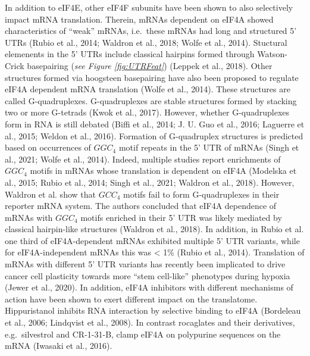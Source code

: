 \documentclass[12pt,openany]{book}
\begin{document}
In addition to eIF4E, other eIF4F subunits have been shown to also
selectively impact mRNA translation. Therein, mRNAs dependent on eIF4A
showed characteristics of ``weak'' mRNAs, i.e.~these mRNAs had long and
structured 5' UTRs (Rubio et al., 2014; Waldron et al., 2018; Wolfe et
al., 2014). Stuctural elemenents in the 5' UTRs include classical
hairpins formed through Watson-Crick basepairing (\emph{see Figure
\ref{fig:UTRFeat}}) (Leppek et al., 2018). Other structures formed via
hoogsteen basepairing have also been proposed to regulate eIF4A
dependent mRNA translation (Wolfe et al., 2014). These structures are
called G-quadruplexes. G-quadruplexes are stable structures formed by
stacking two or more G-tetrads (Kwok et al., 2017). However, whether
G-quadruplexes form in RNA is still debated (Biffi et al., 2014; J. U.
Guo et al., 2016; Laguerre et al., 2015; Weldon et al., 2016). Formation
of G-quadruplex structures is predicted based on occurrences of
\(GGC_4\) motif repeats in the 5' UTR of mRNAs (Singh et al., 2021;
Wolfe et al., 2014). Indeed, multiple studies report enrichments of
\(GGC_4\) motifs in mRNAs whose translation is dependent on eIF4A
(Modelska et al., 2015; Rubio et al., 2014; Singh et al., 2021; Waldron
et al., 2018). However, Waldron et al. show that \(GCC_4\) motifs fail
to form G-quadruplexes in their reporter mRNA system. The authors
concluded that eIF4A dependence of mRNAs with \(GGC_4\) motifs enriched
in their 5' UTR was likely mediated by classical hairpin-like structures
(Waldron et al., 2018). In addition, in Rubio et al. one third of
eIF4A-dependent mRNAs exhibited multiple 5' UTR variants, while for
eIF4A-independent mRNAs this was \textless{} 1\% (Rubio et al., 2014).
Translation of mRNAs with different 5' UTR variants has recently been
implicated to drive cancer cell plasticity towards more ``stem
cell-like'' phenotypes during hypoxia (Jewer et al., 2020). In addition,
eIF4A inhibitors with different mechanisms of action have been shown to
exert different impact on the translatome. Hippuristanol inhibits RNA
interaction by selective binding to eIF4A (Bordeleau et al., 2006;
Lindqvist et al., 2008). In contrast rocaglates and their derivatives,
e.g.~silvestrol and CR-1-31-B, clamp eIF4A on polypurine sequences on
the mRNA (Iwasaki et al., 2016).
\end{document}
